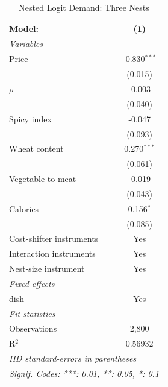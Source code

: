 
\begin{table}[H]
   \caption{\label{tab:nested-logit-three-nests} Nested Logit Demand: Three Nests}
   \centering
   \begin{tabular}{lc}
      \tabularnewline \midrule \midrule
      Model:                   & (1)\\  
      \midrule
      \emph{Variables}\\
      Price                    & -0.830$^{***}$\\   
                               & (0.015)\\   
      $\rho$                   & -0.003\\   
                               & (0.040)\\   
      Spicy index              & -0.047\\   
                               & (0.093)\\   
      Wheat content            & 0.270$^{***}$\\   
                               & (0.061)\\   
      Vegetable-to-meat        & -0.019\\   
                               & (0.043)\\   
      Calories                 & 0.156$^{*}$\\   
                               & (0.085)\\   
      Cost-shifter instruments & Yes\\  
      Interaction instruments  & Yes\\  
      Nest-size instrument     & Yes\\  
      \midrule
      \emph{Fixed-effects}\\
      dish                     & Yes\\  
      \midrule
      \emph{Fit statistics}\\
      Observations             & 2,800\\  
      R$^2$                    & 0.56932\\  
      \midrule \midrule
      \multicolumn{2}{l}{\emph{IID standard-errors in parentheses}}\\
      \multicolumn{2}{l}{\emph{Signif. Codes: ***: 0.01, **: 0.05, *: 0.1}}\\
   \end{tabular}
\end{table}


